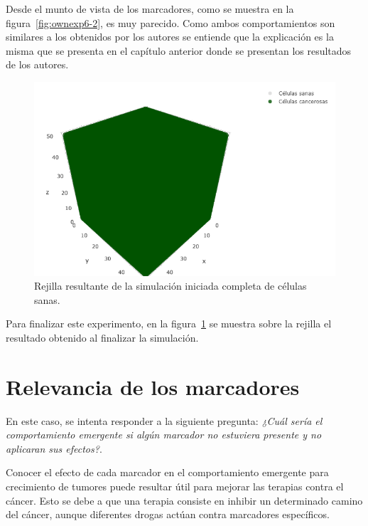 Desde el munto de vista de los marcadores, como se muestra en la figura~\ref{fig:ownexp6-2}, es muy
parecido. Como ambos comportamientos son similares a los obtenidos por los autores se entiende
que la explicación es la misma que se presenta en el capítulo anterior donde
se presentan los resultados de los autores.

\begin{figure}[h]
\centering
\includegraphics[scale=0.6]{figures/experiments/exp6/grid}
\caption{Rejilla resultante de la simulación iniciada completa de células sanas.}
\label{fig:ownexp6-3}
\end{figure}

Para finalizar este experimento, en la figura~\ref{fig:ownexp6-3} se muestra sobre la rejilla el resultado
obtenido al finalizar la simulación.

\clearpage

\section{Relevancia de los marcadores}

En este caso, se intenta responder a la siguiente pregunta: \textit{¿Cuál sería
el comportamiento emergente si algún marcador no estuviera presente y no aplicaran
sus efectos?}.

Conocer el efecto de cada marcador en el comportamiento emergente para crecimiento de tumores
puede resultar útil para mejorar las terapias contra el cáncer. Esto se debe a que una terapia
consiste en inhibir un determinado camino del cáncer, aunque diferentes drogas actúan contra marcadores específicos.

